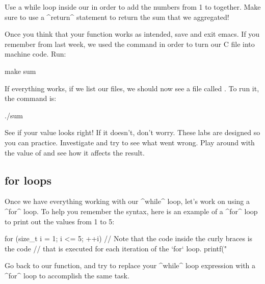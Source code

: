 \documentclass{tufte-handout}
\begin{document}
\noindent
Use a while loop inside our  in order to
add the numbers from 1 to  together. Make sure to
use a ^return^ statement to return the sum that we aggregated!

Once you think that your function works as intended, save and exit
emacs. If you remember from last week, we used the 
command in order to turn our C file into machine code. Run:

\begin{CmdLine*}
  \C make sum\\
\end{CmdLine*}

\noindent
If everything works, if we list our files, we should now see a file
called . To run it, the command is:

\begin{CmdLine*}
  \C ./sum\\
\end{CmdLine*}

\noindent
See if your value looks right!
If it doesn't, don't worry. These labs are designed so you can practice.
Investigate and try to see what went wrong.  Play around with the value of  and see
how it affects the result.

\subsection{{\codestyleKeyword for} loops}

Once we have everything working with our ^while^ loop, let's work on
using a ^for^ loop.  To help you remember the syntax, here is an example
of a ^for^ loop to print out the values from 1 to 5:

\begin{Code}
    for (size_t i = 1; i <= 5; ++i) {
        // Note that the code inside the curly braces is the code
        // that is executed for each iteration of the `for` loop.
        printf("%
    }
\end{Code}

Go back to our  function, and try to replace
your ^while^ loop expression with a ^for^ loop to accomplish the same task.
\end{document}
